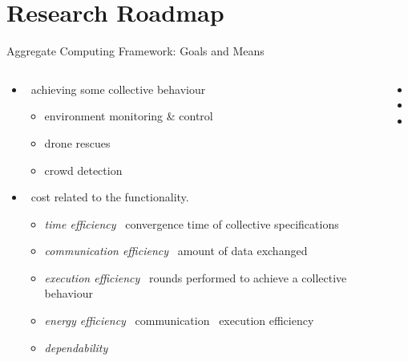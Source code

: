 \documentclass[8pt, aspectratio=169, handout]{beamer}
\begin{document}
\section{Research Roadmap}
\begin{frame}{Aggregate Computing Framework: Goals and Means}
  \begin{columns}
    \begin{column}[t]{0.6\textwidth}
      \begin{card}[Goals]
        \begin{itemize}
          \item[\success{\faInfo}]  \faArrowRight \, achieving some collective behaviour
          \begin{itemize}
            \item environment monitoring \& control
            \item drone rescues
            \item crowd detection
          \end{itemize}
          \item[\success{\faInfo}]  \faArrowRight \, cost related to the functionality.
          \begin{itemize}
            \item \emph{time efficiency} \faArrowRight \, convergence time of collective specifications
            \item \emph{communication efficiency} \faArrowRight \, amount of data exchanged
            \item \emph{execution efficiency} \faArrowRight \, rounds performed to achieve a collective behaviour
            \item \emph{energy efficiency} \faArrowRight \, communication \faPlus \, execution efficiency
            \item \emph{dependability}
          \end{itemize}
        \end{itemize}
      \end{card}
    \end{column}

    \begin{column}[t]{0.4\textwidth}
      \begin{card}[Means]
        \begin{itemize}  
          \item[\success{\faInfo}] 
          \item[\success{\faInfo}] 
          \item[\success{\faInfo}] 
        \end{itemize}
      \end{card}
    \end{column}
  \end{columns}
\end{frame}
\end{document}
